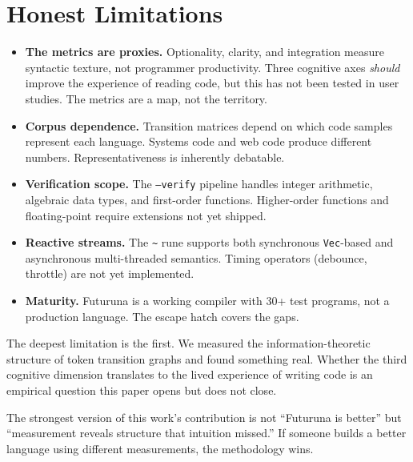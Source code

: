 \documentclass[11pt,a4paper]{article}
\begin{document}
\section{Honest Limitations}

\begin{itemize}[nosep]
\item \textbf{The metrics are proxies.} Optionality, clarity, and integration measure syntactic texture, not programmer productivity. Three cognitive axes \emph{should} improve the experience of reading code, but this has not been tested in user studies. The metrics are a map, not the territory.

\item \textbf{Corpus dependence.} Transition matrices depend on which code samples represent each language. Systems code and web code produce different numbers. Representativeness is inherently debatable.

\item \textbf{Verification scope.} The \texttt{--verify} pipeline handles integer arithmetic, algebraic data types, and first-order functions. Higher-order functions and floating-point require extensions not yet shipped.

\item \textbf{Reactive streams.} The \texttt{\textasciitilde} rune supports both synchronous \texttt{Vec}-based and asynchronous multi-threaded semantics. Timing operators (debounce, throttle) are not yet implemented.

\item \textbf{Maturity.} Futuruna is a working compiler with 30+ test programs, not a production language. The escape hatch covers the gaps.
\end{itemize}

The deepest limitation is the first. We measured the information-theoretic structure of token transition graphs and found something real. Whether the third cognitive dimension translates to the lived experience of writing code is an empirical question this paper opens but does not close.

The strongest version of this work's contribution is not ``Futuruna is better'' but ``measurement reveals structure that intuition missed.'' If someone builds a better language using different measurements, the methodology wins.

\end{document}
